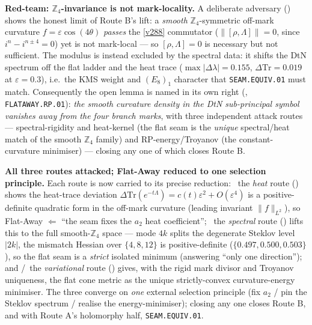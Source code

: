 \documentclass[11pt,a4paper]{article}
\begin{document}
\begin{keybox}
\par\smallskip\noindent\textbf{Red-team: $\mathbb{Z}_4$-invariance is not mark-locality.} A deliberate
adversary () shows the honest limit of Route B's lift: a
\emph{smooth} $\mathbb{Z}_4$-symmetric off-mark curvature $f=\varepsilon\cos(4\theta)$ \emph{passes} the
\vref{v288} commutator ($\|[\rho,\Lambda]\|=0$, since $i^n-i^{n\pm4}=0$) yet is not mark-local --- so
$[\rho,\Lambda]{=}0$ is necessary but not sufficient. The modulus is instead excluded by the spectral data:
it shifts the DtN spectrum off the flat ladder and the heat trace ($\max|\Delta\lambda|=0.155$,
$\Delta\mathrm{Tr}=0.019$ at $\varepsilon=0.3$), i.e.\ the KMS weight and $(E_8)_1$ character that
\texttt{SEAM.EQUIV.01} must match. Consequently the open lemma is named in its own right
(, \texttt{FLATAWAY.RP.01}): \emph{the smooth curvature density in the DtN
sub-principal symbol vanishes away from the four branch marks}, with three independent attack routes ---
spectral-rigidity and heat-kernel (the flat seam is the \emph{unique} spectral/heat match of the smooth
$\mathbb{Z}_4$ family) and RP-energy/Troyanov (the constant-curvature minimiser) --- closing any one of which
closes Route B.
\par\smallskip\noindent\textbf{All three routes attacked; Flat-Away reduced to one selection principle.} Each
route is now carried to its precise reduction: \mE\ the \emph{heat} route
() shows the heat-trace deviation
$\Delta\mathrm{Tr}(e^{-t\Lambda})=c(t)\varepsilon^2+O(\varepsilon^4)$ is a positive-definite quadratic form in
the off-mark curvature (leading invariant $\|f\|_{L^2}$), so Flat-Away $\Leftarrow$ ``the seam fixes the $a_2$
heat coefficient''; \mE\ the \emph{spectral} route () lifts this to
the full smooth-$\mathbb{Z}_4$ space --- mode $4k$ splits the degenerate Steklov level $|2k|$, the mismatch
Hessian over $\{4,8,12\}$ is positive-definite ($\{0.497,0.500,0.503\}$), so the flat seam is a \emph{strict}
isolated minimum (answering ``only one direction''); and \mE/\mC\ the \emph{variational} route
() gives, with the rigid mark divisor and Troyanov uniqueness, the flat cone
metric as the unique strictly-convex curvature-energy minimiser. The three converge on \emph{one} external
selection principle (fix $a_2$ / pin the Steklov spectrum / realise the energy-minimiser); closing any one
closes Route B, and with Route A's holomorphy half, \texttt{SEAM.EQUIV.01}.

\end{keybox}
\end{document}
